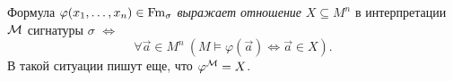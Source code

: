 \begin{definition}
    Формула $\varphi(x_{1}, \ldots, x_{n}) \in \mathrm{Fm}_{\sigma}$ {\it выражает отношение} $X \subseteq M^{n}$ в интерпретации $\mathcal{M}$ сигнатуры $\sigma$ $\iff$
    $$
        \forall \vec{a} \in M^{n}~(M \models \varphi(\vec{a}) \iff \vec{a} \in X).
    $$
    В такой ситуации пишут еще, что $\varphi^{\mathcal{M}} = X$.
\end{definition}